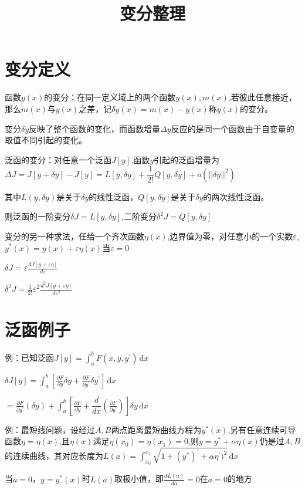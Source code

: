 \documentclass{article}
\begin{document}
\title{变分整理}
\maketitle
\tableofcontents
\section{变分定义}
函数$y(x)$的变分：在同一定义域上的两个函数$y(x),m(x)$,若彼此任意接近，那么$m(x)$与$y(x)$之差，记$\delta y(x)=m(x)-y(x)$称$y(x)$的变分。

变分$\delta y$反映了整个函数的变化，而函数增量$ \Delta y $反应的是同一个函数由于自变量的取值不同引起的变化。

泛函的变分：对任意一个泛函$J[y]$,函数$y$引起的泛函增量为$\Delta J=J[y+\delta y]-J[y]=L[y,\delta y]+\dfrac{1}{2!}Q[y,\delta y]+o(||\delta y||^2)$

其中$L(y,\delta y)$是关于$\delta y$的线性泛函，$Q[y,\delta y]$是关于$\delta y$的两次线性泛函。

则泛函的一阶变分$\delta J=L[y,\delta y]$,二阶变分$\delta^2J=Q[y,\delta y]$

变分的另一种求法，任给一个齐次函数$\eta(x)$,边界值为零，对任意小的一个实数$\varepsilon$,$y^{*}(x)=y(x)+\varepsilon\eta(x)$当$\varepsilon=0$

$\delta J=\varepsilon\frac{dJ[y+\varepsilon\eta]}{d\varepsilon}$

$\delta^2 J=\frac{1}{2!}\varepsilon^2\frac{d^2J[y+\varepsilon\eta]}{d\varepsilon^2}$

\section{泛函例子}
例：已知泛函$J[y]=\int_{a}^{b}F(x,y,y^{'})\,\mathrm{d}x$

$ \delta J[y]=\int_{a}^{b}[\frac{\partial F}{\partial y}\delta y+\frac{\partial F}{\partial y^{'}}\delta y^{'}]\,\mathrm{d}x $

$=\frac{\partial F}{\partial y^{'}}(\delta y)+\int_{a}^{b}[\frac{\partial F}{\partial y}+\dfrac{d}{dx}(\frac{\partial F}{\partial y^{'}})]\delta y\,\mathrm{d}x $

例：最短线问题，设经过$A,B$两点距离最短曲线方程为$y^{*}(x)$,另有任意连续可导函数$\eta=\eta(x)$,且$\eta(x)$满足$\eta(x_{0})=\eta(x_{1})=0$,则$y=y^{*}+\alpha\eta(x)$仍是过$A,B$的连续曲线，其对应长度为$L(a)=\int_{x_{0}}^{x_{1}}\sqrt{1+(y^{*})^{'}+\alpha\eta^{'})^2}\,\mathrm{d}x$

当$a=0$，$y=y^{*}(x)$时$L(a)$取极小值，即$\frac{dL(a)}{da}=0$在$a=0$的地方
\end{document}
